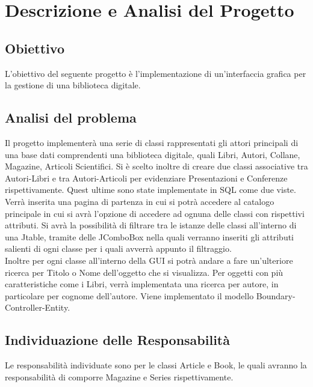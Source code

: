 \chapter{Descrizione e Analisi del Progetto}
\section{Obiettivo}

L'obiettivo del seguente progetto è l'implementazione di un'interfaccia grafica per la gestione di una biblioteca digitale. 
\section{Analisi del problema}
Il progetto implementerà una serie di classi rappresentati gli attori principali di una base dati comprendenti una biblioteca digitale, quali Libri, Autori, Collane, Magazine, Articoli Scientifici. Si è scelto inoltre di creare due classi associative tra Autori-Libri e tra Autori-Articoli per evidenziare Presentazioni e Conferenze rispettivamente. Quest ultime sono state implementate in SQL come due viste. \\
Verrà inserita una pagina di partenza in cui si potrà accedere al catalogo principale in cui si avrà l'opzione di accedere ad ognuna delle classi con rispettivi attributi. 
Si avrà la possibilità di filtrare tra le istanze delle classi  all'interno di una Jtable, tramite delle JComboBox nella quali verranno inseriti gli attributi salienti di ogni classe per i quali avverrà appunto il filtraggio.\\
Inoltre per ogni classe all'interno della GUI si potrà andare a fare un'ulteriore ricerca per Titolo o Nome dell'oggetto che si visualizza. Per oggetti con più caratteristiche come i Libri, verrà implementata una ricerca per autore, in particolare per cognome dell'autore.
Viene implementato il modello Boundary-Controller-Entity.

\section{Individuazione delle Responsabilità}
Le responsabilità individuate sono per le classi Article e Book, le quali avranno la responsabilità di comporre Magazine e Series rispettivamente.
\newpage